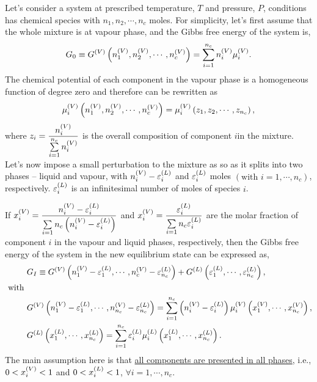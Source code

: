 Let's consider a system at prescribed temperature, $T$ and pressure, $P$, conditions has chemical species with $n_{1}, n_{2}, \cdots, n_{c}$ moles. For simplicity, let's first assume that the whole mixture is at vapour phase, and the Gibbs free energy of the system is,
\begin{equation}
   G_{0} \equiv \mfr[G]{}{V}\left(\mfr[n]{1}{V}, \mfr[n]{2}{V}, \cdots, \mfr[n]{c}{V}\right) = \summation_{i=1}^{n_{c}}\mfr[n]{i}{V}\mfr[\mu]{i}{V}.
\end{equation}   
The chemical potential of each component in the vapour phase is a homogeneous function of degree zero and therefore can be rewritten as
\begin{displaymath}
   \mfr[\mu]{i}{V}\left(\mfr[n]{1}{V}, \mfr[n]{2}{V}, \cdots, \mfr[n]{c}{V}\right) = \mfr[\mu]{i}{V}\left(z_{1},z_{2}, \cdots, z_{n_{c}}\right),
\end{displaymath}
where $z_{i}=\frc{\mfr[n]{i}{V}}{\summation_{i=1}^{n_{c}}\mfr[n]{i}{V}}$ is the overall composition of component $i$in the mixture. Let's now impose a small perturbation to the mixture as so as it splits into two phases -- liquid and vapour, with $\mfr[n]{i}{V}-\mfr[\varepsilon]{i}{L}$ and $\mfr[\varepsilon]{i}{L}$ moles $\left(\text{with }i=1, \cdots, n_{c}\right)$, respectively. $\mfr[\varepsilon]{i}{L}$ is an infinitesimal number of moles of species $i$. 

If $\mfr[x]{i}{V}=\frc{\mfr[n]{i}{V}-\mfr[\varepsilon]{i}{L}}{\summation_{i=1}{n_{c}}\left(\mfr[n]{i}{V}-\mfr[\varepsilon]{i}{L}\right)}$ and $\mfr[x]{i}{V}=\frc{\mfr[\varepsilon]{i}{L}}{\summation_{i=1}{n_{c}}\mfr[\varepsilon]{i}{L}}$ are the molar fraction of component $i$ in the vapour and liquid phases, respectively, then the Gibbs free energy of the system in the new equilibrium state can be expressed as,
\begin{subequations}
  \begin{align}
   &G_{I} \equiv \mfr[G]{}{V}\left(\mfr[n]{1}{V}-\mfr[\varepsilon]{1}{L}, \cdots, \mfr[n]{c}{V}-\mfr[\varepsilon]{n_{c}}{L}\right) + \mfr[G]{}{L}\left(\mfr[\varepsilon]{1}{L}, \cdots, \mfr[\varepsilon]{n_{c}}{L}\right), \\
\text{ with }& \nonumber\\
        &\mfr[G]{}{V}\left(\mfr[n]{1}{V}-\mfr[\varepsilon]{1}{L}, \cdots, \mfr[n]{n_{c}}{V}-\mfr[\varepsilon]{n_{c}}{L}\right) = \summation_{i=1}^{n_{c}}\left(\mfr[n]{i}{V}-\mfr[\varepsilon]{i}{L}\right) \mfr[\mu]{i}{V}\left(\mfr[x]{1}{V}, \cdots, \mfr[x]{n_{c}}{V}\right), \\
   &\mfr[G]{}{L}\left(\mfr[x]{1}{L}, \cdots, \mfr[x]{n_{c}}{L}\right) = \summation_{i=1}^{n_{c}}\mfr[\varepsilon]{i}{L}\mfr[\mu]{i}{L}\left(\mfr[x]{1}{L}, \cdots, \mfr[x]{n_{c}}{L}\right).\label{Chapter:ThermodynamicFormulation:Eqn:Stability_DG0}
  \end{align}
\end{subequations}
The main assumption here is that \underline{all components are presented in all phases}, i.e., $0<\mfr[x]{i}{V}<1$ and $0<\mfr[x]{i}{L}<1$, $\forall i=1, \cdots, n_{c}$. 

